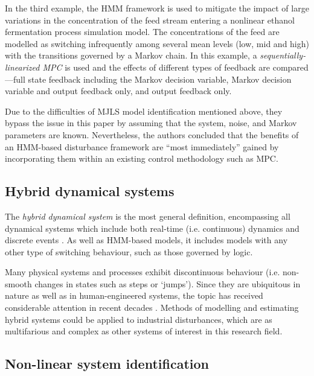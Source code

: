 In the third example, the HMM framework is used to mitigate the impact of large variations in the concentration of the feed stream entering a nonlinear ethanol fermentation process simulation model. The concentrations of the feed are modelled as switching infrequently among several mean levels (low, mid and high) with the transitions governed by a Markov chain. In this example, a \textit{sequentially-linearized MPC} \citep{lee_extended_1994} is used and the effects of different types of feedback are compared---full state feedback including the Markov decision variable, Markov decision variable and output feedback only, and output feedback only.

Due to the difficulties of MJLS model identification mentioned above, they bypass the issue in this paper by assuming that the system, noise, and Markov parameters are known. Nevertheless, the authors concluded that the benefits of an HMM-based disturbance framework are ``most immediately'' gained by incorporating them within an existing control methodology such as MPC.

\subsection{Hybrid dynamical systems}

The \textit{hybrid dynamical system} is the most general definition, encompassing all dynamical systems which include both real-time (i.e. continuous) dynamics and discrete events \citep{van_der_schaft_introduction_2000}. As well as HMM-based models, it includes models with any other type of switching behaviour, such as those governed by logic.

Many physical systems and processes exhibit discontinuous behaviour (i.e. non-smooth changes in states such as steps or ‘jumps’). Since they are ubiquitous in nature as well as in human-engineered systems, the topic has received considerable attention in recent decades \citep{sworder_boyd_1999, bemporad_identification_2001, costa_discrete-time_2005, camacho_model_2010, djemai_hybrid_2014, estrada_hybrid_2014, guo_moving_2013, botha_hybrid_2018, bemporad_fitting_2018, oliveira_iterative_2020, piga_estimation_2020}. Methods of modelling and estimating hybrid systems could be applied to industrial disturbances, which are as multifarious and complex as other systems of interest in this research field.

\subsection{Non-linear system identification}


